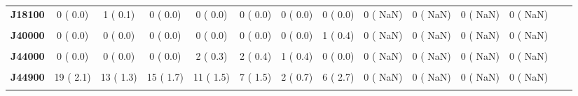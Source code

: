 \documentclass[
]{article}
\begin{document}
\begin{table}[H]
\begin{tabular}[t]{>{\raggedright\arraybackslash}p{5em}ccccccccccccc}
\textbf{J18100} & 0 (  0.0) & 1 (  0.1) & 0 (  0.0) & 0 (  0.0) & 0 (  0.0) & 0 (  0.0) & 0 (  0.0) & 0 (  NaN) & 0 (  NaN) & 0 (  NaN) & 0 (  NaN) &  & \\
\textbf{\cellcolor{gray!10}{J18900}} & \cellcolor{gray!10}{20 (  2.2)} & \cellcolor{gray!10}{19 (  2.0)} & \cellcolor{gray!10}{12 (  1.3)} & \cellcolor{gray!10}{11 (  1.5)} & \cellcolor{gray!10}{4 (  0.9)} & \cellcolor{gray!10}{6 (  2.2)} & \cellcolor{gray!10}{2 (  0.9)} & \cellcolor{gray!10}{0 (  NaN)} & \cellcolor{gray!10}{0 (  NaN)} & \cellcolor{gray!10}{0 (  NaN)} & \cellcolor{gray!10}{0 (  NaN)} & \cellcolor{gray!10}{} & \cellcolor{gray!10}{}\\
\textbf{J40000} & 0 (  0.0) & 0 (  0.0) & 0 (  0.0) & 0 (  0.0) & 0 (  0.0) & 0 (  0.0) & 1 (  0.4) & 0 (  NaN) & 0 (  NaN) & 0 (  NaN) & 0 (  NaN) &  & \\
\textbf{\cellcolor{gray!10}{J43900}} & \cellcolor{gray!10}{1 (  0.1)} & \cellcolor{gray!10}{0 (  0.0)} & \cellcolor{gray!10}{0 (  0.0)} & \cellcolor{gray!10}{0 (  0.0)} & \cellcolor{gray!10}{0 (  0.0)} & \cellcolor{gray!10}{0 (  0.0)} & \cellcolor{gray!10}{0 (  0.0)} & \cellcolor{gray!10}{0 (  NaN)} & \cellcolor{gray!10}{0 (  NaN)} & \cellcolor{gray!10}{0 (  NaN)} & \cellcolor{gray!10}{0 (  NaN)} & \cellcolor{gray!10}{} & \cellcolor{gray!10}{}\\
\textbf{J44000} & 0 (  0.0) & 0 (  0.0) & 0 (  0.0) & 2 (  0.3) & 2 (  0.4) & 1 (  0.4) & 0 (  0.0) & 0 (  NaN) & 0 (  NaN) & 0 (  NaN) & 0 (  NaN) &  & \\
\textbf{\cellcolor{gray!10}{J44100}} & \cellcolor{gray!10}{2 (  0.2)} & \cellcolor{gray!10}{2 (  0.2)} & \cellcolor{gray!10}{0 (  0.0)} & \cellcolor{gray!10}{3 (  0.4)} & \cellcolor{gray!10}{1 (  0.2)} & \cellcolor{gray!10}{0 (  0.0)} & \cellcolor{gray!10}{1 (  0.4)} & \cellcolor{gray!10}{0 (  NaN)} & \cellcolor{gray!10}{0 (  NaN)} & \cellcolor{gray!10}{0 (  NaN)} & \cellcolor{gray!10}{0 (  NaN)} & \cellcolor{gray!10}{} & \cellcolor{gray!10}{}\\
\textbf{J44900} & 19 (  2.1) & 13 (  1.3) & 15 (  1.7) & 11 (  1.5) & 7 (  1.5) & 2 (  0.7) & 6 (  2.7) & 0 (  NaN) & 0 (  NaN) & 0 (  NaN) & 0 (  NaN) &  & \\
\textbf{\cellcolor{gray!10}{J45900}} & \cellcolor{gray!10}{0 (  0.0)} & \cellcolor{gray!10}{1 (  0.1)} & \cellcolor{gray!10}{0 (  0.0)} & \cellcolor{gray!10}{0 (  0.0)} & \cellcolor{gray!10}{0 (  0.0)} & \cellcolor{gray!10}{0 (  0.0)} & \cellcolor{gray!10}{0 (  0.0)} & \cellcolor{gray!10}{0 (  NaN)} & \cellcolor{gray!10}{0 (  NaN)} & \cellcolor{gray!10}{0 (  NaN)} & \cellcolor{gray!10}{0 (  NaN)} & \cellcolor{gray!10}{} & \cellcolor{gray!10}{}\\

\end{tabular}
\end{table}
\end{document}
